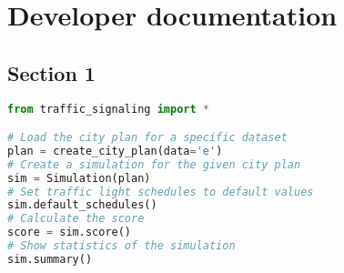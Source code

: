 \chapter{Developer documentation} \label{chap:developer_documentation}


\section{Section 1}


\begin{lstlisting}[language=Python]
from traffic_signaling import *

# Load the city plan for a specific dataset
plan = create_city_plan(data='e')
# Create a simulation for the given city plan
sim = Simulation(plan)
# Set traffic light schedules to default values
sim.default_schedules()
# Calculate the score
score = sim.score()
# Show statistics of the simulation
sim.summary()
\end{lstlisting}